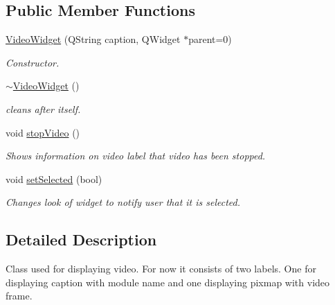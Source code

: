 \subsection*{Public Member Functions}
\begin{DoxyCompactItemize}
\item 
\hyperlink{class_video_widget_ae680c5ae93ec4a7af13bf24ed431660a}{VideoWidget} (QString caption, QWidget $\ast$parent=0)
\begin{DoxyCompactList}\small\item\em Constructor. \item\end{DoxyCompactList}\item 
\hypertarget{class_video_widget_a77b8af4076f462cb5db7932e88d46829}{
\hyperlink{class_video_widget_a77b8af4076f462cb5db7932e88d46829}{$\sim$VideoWidget} ()}
\label{db/df7/class_video_widget_a77b8af4076f462cb5db7932e88d46829}

\begin{DoxyCompactList}\small\item\em cleans after itself. \item\end{DoxyCompactList}\item 
\hypertarget{class_video_widget_a7cd8b0959b43587884972e2076fb05d2}{
void \hyperlink{class_video_widget_a7cd8b0959b43587884972e2076fb05d2}{stopVideo} ()}
\label{db/df7/class_video_widget_a7cd8b0959b43587884972e2076fb05d2}

\begin{DoxyCompactList}\small\item\em Shows information on video label that video has been stopped. \item\end{DoxyCompactList}\item 
void \hyperlink{class_video_widget_af98a0482139c6fce67225501ea2c2922}{setSelected} (bool)
\begin{DoxyCompactList}\small\item\em Changes look of widget to notify user that it is selected. \item\end{DoxyCompactList}\end{DoxyCompactItemize}


\subsection{Detailed Description}
Class used for displaying video. For now it consists of two labels. One for displaying caption with module name and one displaying pixmap with video frame. 

